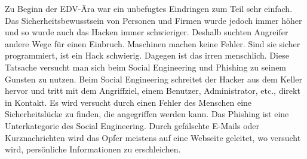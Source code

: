 Zu Beginn der EDV-Ära war ein unbefugtes Eindringen zum Teil sehr einfach. Das Sicherheitsbewusstsein von Personen und Firmen wurde jedoch immer höher und so wurde auch das Hacken immer schwieriger. Deshalb suchten Angreifer andere Wege für einen Einbruch. 
Maschinen machen keine Fehler. Sind sie sicher programmiert, ist ein Hack schwierig. Dagegen ist das irren menschlich. Diese Tatsache versucht man sich beim Social Engineering und Phishing zu seinem Gunsten zu nutzen.
Beim Social Engineering schreitet  der Hacker aus dem Keller hervor und tritt mit dem Angriffziel, einem Benutzer, Administrator, etc., direkt in Kontakt. Es wird versucht durch einen Fehler des Menschen eine Sicherheitslücke zu finden, die angegriffen werden kann. 
Das Phishing ist eine Unterkategorie des Social Engineering. Durch gefälschte E-Mails oder Kurznachrichten wird das Opfer meistens auf eine Webseite geleitet, wo versucht wird, persönliche Informationen zu erschleichen.


